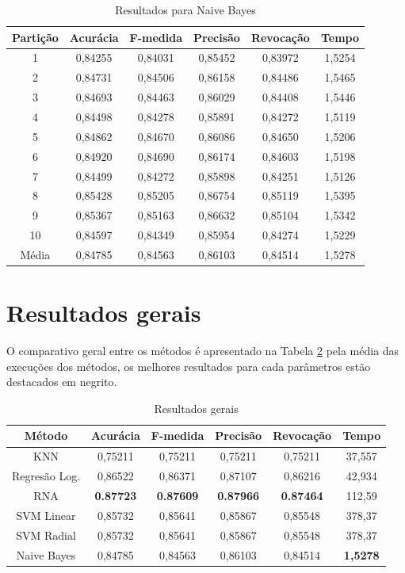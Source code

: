 \begin{table}[h]
\centering
\caption{Resultados para Naive Bayes}
\vspace{0.2cm}
\begin{tabular}{c|c|c|c|c|c}
Partição & Acurácia & F-medida & Precisão & Revocação & Tempo \\
\hline
1  & 0,84255 & 0,84031 & 0,85452 & 0,83972 & 1,5254 \\
2  & 0,84731 & 0,84506 & 0,86158 & 0,84486 & 1,5465 \\
3  & 0,84693 & 0,84463 & 0,86029 & 0,84408 & 1,5446 \\
4  & 0,84498 & 0,84278 & 0,85891 & 0,84272 & 1,5119 \\
5  & 0,84862 & 0,84670 & 0,86086 & 0,84650 & 1,5206 \\
6  & 0,84920 & 0,84690 & 0,86174 & 0,84603 & 1,5198 \\
7  & 0,84499 & 0,84272 & 0,85898 & 0,84251 & 1,5126 \\
8  & 0,85428 & 0,85205 & 0,86754 & 0,85119 & 1,5395 \\
9  & 0,85367 & 0,85163 & 0,86632 & 0,85104 & 1,5342 \\
10 & 0,84597 & 0,84349 & 0,85954 & 0,84274 & 1,5229 \\
\hline
Média & 0,84785 & 0,84563 & 0,86103 & 0,84514 & 1,5278 \\

\end{tabular} 
\label{table:resultadosNB}
\end{table}

\section{Resultados gerais}

O comparativo geral entre os métodos é apresentado na Tabela \ref{table:resultadosGerais} pela média das execuções dos métodos, os melhores resultados para cada parâmetros estão destacados em negrito.

\begin{table}[h]
\centering
\caption{Resultados gerais}
\vspace{0.2cm}
\begin{tabular}{c|c|c|c|c|c}
Método & Acurácia & F-medida & Precisão & Revocação & Tempo \\
\hline
KNN                & 0,75211 & 0,75211 & 0,75211 & 0,75211 & 37,557 \\
Regresão Log.      & 0,86522 & 0,86371 & 0,87107 & 0,86216 & 42,934 \\
RNA                & \textbf{0.87723} & \textbf{0.87609} & \textbf{0.87966} & \textbf{0.87464} & 112,59 \\
SVM Linear         & 0,85732 & 0,85641 & 0,85867 & 0,85548 & 378,37 \\
SVM Radial         & 0,85732 & 0,85641 & 0,85867 & 0,85548 & 378,37 \\
Naive Bayes        & 0,84785 & 0,84563 & 0,86103 & 0,84514 & \textbf{1,5278} \\
\end{tabular}
\label{table:resultadosGerais}
\end{table}


